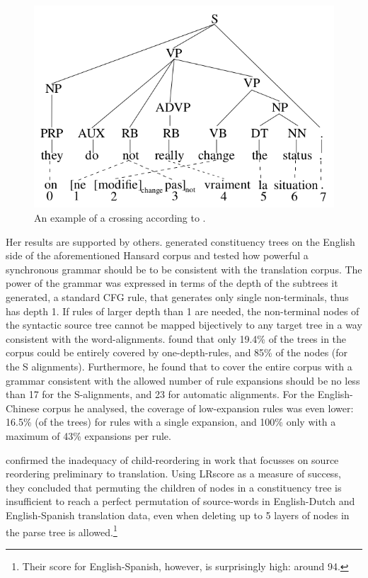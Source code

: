 \documentclass{report}
\begin{document}
\begin{figure}[!ht]
\centering
\includegraphics[scale=0.4]{crossing.png}
\caption{An example of a crossing according to \cite{fox2002phrasal}.}\label{fig:fox}
\end{figure}

Her results are supported by others. \cite{galley2004s} generated constituency trees on the English side of the aforementioned Hansard corpus and tested how powerful a synchronous grammar should be to be consistent with the translation corpus. The power of the grammar was expressed in terms of the depth of the subtrees it generated, a standard CFG rule, that generates only single non-terminals, thus has depth 1. If rules of larger depth than 1 are needed, the non-terminal nodes of the syntactic source tree cannot be mapped bijectively to any target tree in a way consistent with the word-alignments. \citeauthor{galley2004s} found that only 19.4\% of the trees in the corpus could be entirely covered by one-depth-rules, and 85\% of the nodes (for the S alignments). Furthermore, he found that to cover the entire corpus with a grammar consistent with the allowed number of rule expansions should be no less than 17 for the S-alignments, and 23 for automatic alignments. For the English-Chinese corpus he analysed, the coverage of low-expansion rules was even lower: 16.5\% (of the trees) for rules with a single expansion, and 100\% only with a maximum of 43\% expansions per rule.

\cite{khalilov2012statistical} confirmed the inadequacy of child-reordering in work that focusses on source reordering preliminary to translation. Using LRscore \citep{birch2010lrscore} as a measure of success, they concluded that permuting the children of nodes in a constituency tree is insufficient to reach a perfect permutation of source-words in English-Dutch and English-Spanish translation data, even when deleting up to 5 layers of nodes in the parse tree is allowed.\footnote{Their score for English-Spanish, however, is surprisingly high: around 94.}
\end{document}
